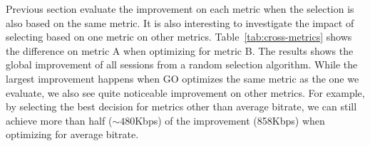\begin{figure}[h!]
\centering
{}
\hspace{-0.6cm}
\hspace{-0.6cm}
\hspace{-0.6cm}
\label{fig:improve}
\end{figure}



Previous section evaluate the improvement on each metric when the selection is also based on the same metric. It is also interesting to investigate the impact of selecting based on one metric on other metrics. Table~\ref{tab:cross-metrics} shows the difference on metric A when optimizing for metric B. The results shows the global improvement of all sessions from a random selection algorithm. 
While the largest improvement happens when GO optimizes the same metric as the one we evaluate, we also see quite noticeable improvement on other metrics. For example, by selecting the best decision for metrics other than average bitrate, we can still achieve more than half ($\sim 480$Kbps) of the improvement (858Kbps) when optimizing for average bitrate.

